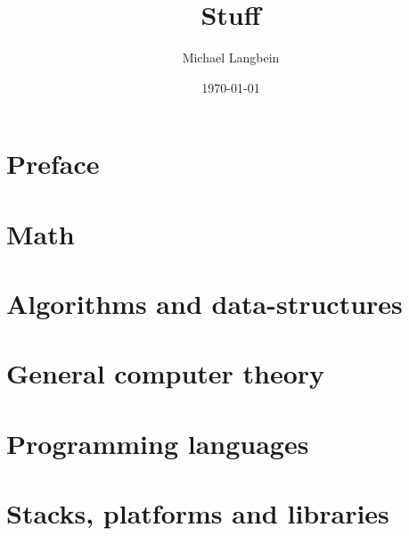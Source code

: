 \documentclass{book}
\title{Stuff}
\author{Michael Langbein}
\date{\today}
\begin{document}
\maketitle
\tableofcontents


\chapter*{Preface}



\chapter{Math}









%






%



\chapter{Algorithms and data-structures}



\chapter{General computer theory}







\chapter{Programming languages}




%






\chapter{Stacks, platforms and libraries}








\end{document}
